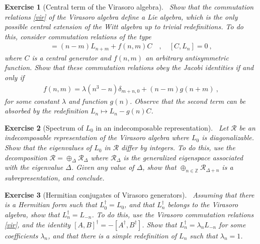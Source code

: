 \documentclass[12pt, a4paper, notitlepage, twoside]{report}
\numberwithin{equation}{section}
\theoremstyle{break}
\newtheorem{exo}{Exercise}[chapter]
\begin{document}
\begin{exo}[Central term of the Virasoro algebra]
~\label{exovir}
 Show that the commutation relations \eqref{vir} of the Virasoro algebra define a Lie algebra, which is the only possible central extension of the Witt algebra up to trivial redefinitions.
To do this, consider commutation relations of the type
\begin{align}
 [L_n,L_m] =(n-m)L_{n+m} + f(n,m) C  \quad , \quad [C,L_n]=0\ ,
\end{align}
where $C$ is a central generator and $f(n,m)$ an arbitrary antisymmetric function.
Show that these commutation relations obey the Jacobi identities if and only if 
\begin{align}
 f(n,m) = \lambda (n^3-n)\delta_{m+n,0} + (n-m)g(n+m)\ ,
\end{align}
for some constant $\lambda$ and function $g(n)$.
Observe that the second term can be absorbed by the redefinition $L_n\mapsto L_n-g(n)C$.
\end{exo}

\begin{exo}[Spectrum of $L_0$ in an indecomposable representation]
 ~\label{exodiffint}
 Let $\mathcal{R}$ be an indecomposable representation of the Virasoro algebra where $L_0$ is diagonalizable. 
Show that the eigenvalues of $L_0$ in  $\mathcal{R}$ differ by integers.
To do this, use the decomposition $\mathcal{R}=\oplus_\Delta \mathcal{R}_\Delta$ where $\mathcal{R}_\Delta$ is the generalized eigenspace associated with the eigenvalue $\Delta$.
Given any value of $\Delta$, show that  $\oplus_{n\in{\mathbb{Z}}} \mathcal{R}_{\Delta+n}$ is a subrepresentation, and conclude. 
\end{exo}

\begin{exo}[Hermitian conjugates of Virasoro generators]
 ~\label{exolnd}
Assuming that there is a Hermitian form such that $L_0^\dagger = L_0$, and that $L_n^\dagger$ belongs to the Virasoro algebra, show that $L_n^\dagger = L_{-n}$. To do this, use the Virasoro commutation relations \eqref{vir}, and the identity $[A,B]^\dagger = -[A^\dagger, B^\dagger]$. Show that $L_n^\dagger = \lambda_n L_{-n}$ for some coefficients $\lambda_n$, and that there is a simple redefinition of $L_n$ such that $\lambda_n=1$.
\end{exo}
\end{document}
